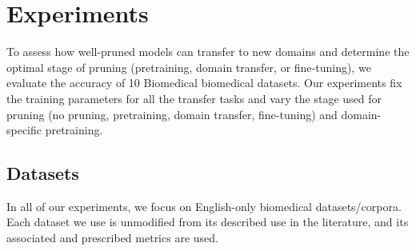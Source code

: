 \section{Experiments}
To assess how well-pruned models can transfer to new domains and determine the optimal stage of pruning (pretraining, domain transfer, or fine-tuning), we evaluate the accuracy of 10 Biomedical biomedical datasets. Our experiments fix the training parameters for all the transfer tasks and vary the stage used for pruning (no pruning, pretraining, domain transfer, fine-tuning) and domain-specific pretraining.
\subsection{Datasets}
In all of our experiments, we focus on English-only biomedical datasets/corpora. Each dataset we use is unmodified from its described use in the literature, and its associated and prescribed metrics are used.\\
